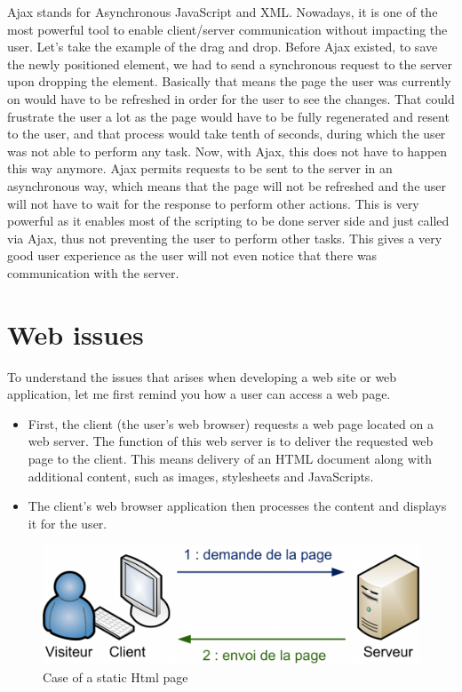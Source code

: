 Ajax stands for Asynchronous JavaScript and XML. Nowadays, it is one of the most powerful tool to enable client/server communication without impacting the user. Let's take the example of the drag and drop. Before Ajax existed, to save the newly positioned element, we had to send a synchronous request to the server upon dropping the element. Basically that means the page the user was currently on would have to be refreshed in order for the user to see the changes. That could frustrate the user a lot as the page would have to be fully regenerated and resent to the user, and that process would take tenth of seconds, during which the user was not able to perform any task. Now, with Ajax, this does not have to happen this way anymore. Ajax permits requests to be sent to the server in an asynchronous way, which means that the page will not be refreshed and the user will not have to wait for the response to perform other actions. This is very powerful as it enables most of the scripting to be done server side and just called via Ajax, thus not preventing the user to perform other tasks. This gives a very good user experience as the user will not even notice that there was communication with the server.

\section{Web issues}

To understand the issues that arises when developing a web site or web application, let me first remind you how a user can access a web page.
\begin{itemize}
\item First, the client (the user's web browser) requests a web page located on a web server. The function of this web server is to deliver the requested web page to the client. This means delivery of an HTML document along with additional content, 
such as images, stylesheets and JavaScripts.
\item The client's web browser application then processes the content and displays it for the user.  
\end{itemize}

\begin{figure}[!ht]
\centering
\includegraphics[width=.55\textwidth]{img/static.png}
\caption{Case of a static Html page}
\label{figure:static-page}
\end{figure}

